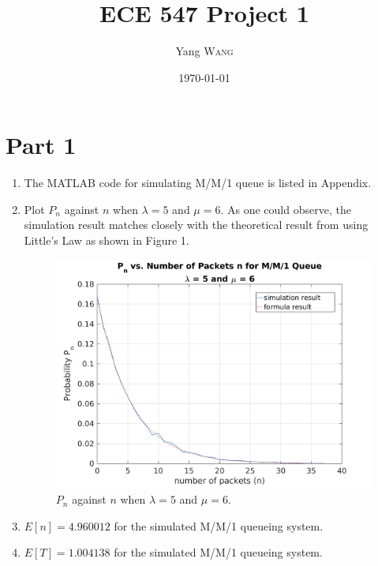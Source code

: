\documentclass{article}
\title{ECE 547 Project 1} %
\author{Yang \textsc{Wang}}  %
\date{\today} %
\begin{document}
\maketitle %


\section*{Part 1}
	\begin{enumerate}
		\item The MATLAB code for simulating M/M/1 queue is listed in Appendix.
		\item Plot $P_n$ against $n$ when $\lambda = 5$ and $\mu = 6$. As one could
			observe, the simulation result matches closely with the theoretical result
			from using Little's Law as shown in Figure 1.
			\begin{figure}[!hbt]
				\centering
				\includegraphics[width=0.8\linewidth]{proj1_p1_pn_vs_n.png}
				\caption{$P_n$ against $n$ when $\lambda = 5$ and $\mu = 6$.}
			\end{figure}
		\item $E[n] = 4.960012$ for the simulated M/M/1 queueing system.
		\item $E[T] = 1.004138$ for the simulated M/M/1 queueing system.
	\end{enumerate}
\end{document}

